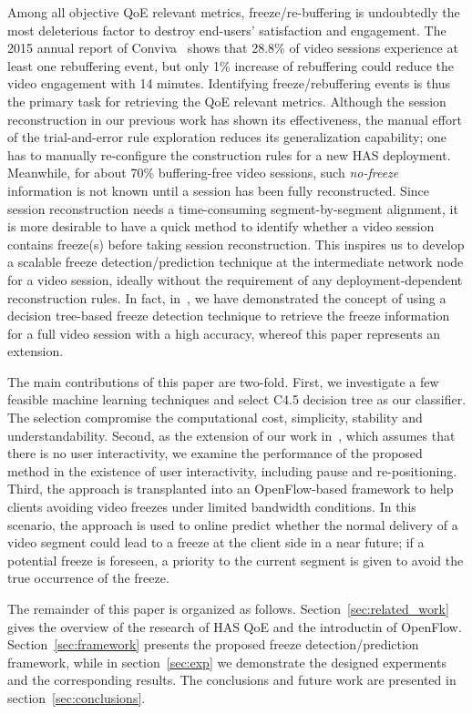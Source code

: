 \documentclass[journal]{IEEEtran}
\begin{document}
Among all objective QoE relevant metrics, freeze/re-buffering is undoubtedly the most deleterious factor to destroy end-users' satisfaction and engagement. The 2015 annual report of Conviva~\cite{convivaC:2015} shows that 28.8\% of video sessions experience at least one rebuffering event, but only 1\% increase of rebuffering could reduce the video engagement with 14 minutes. Identifying freeze/rebuffering events is thus the primary task for retrieving the QoE relevant metrics. Although the session reconstruction in our previous work has shown its effectiveness, the manual effort of the trial-and-error rule exploration reduces its generalization capability; one has to manually re-configure the construction rules for a new HAS deployment. Meanwhile, for about 70\% buffering-free video sessions, such {\it no-freeze} information is not known until a session has been fully reconstructed. Since session reconstruction needs a time-consuming segment-by-segment alignment, it is more desirable to have a quick method to identify whether a video session contains freeze(s) before taking session reconstruction. This inspires us to develop a scalable freeze detection/prediction technique at the intermediate network node for a video session, ideally without the requirement of any deployment-dependent reconstruction rules. In fact, in~\cite{wu:iwqos15}, we have demonstrated the concept of using a decision tree-based freeze detection technique to retrieve the freeze information for a full video session with a high accuracy, whereof this paper represents an extension.

The main contributions of this paper are two-fold. First, we investigate a few feasible machine learning techniques and select C4.5 decision tree as our classifier. The selection compromise the computational cost, simplicity, stability and understandability. Second, as the extension of our work in~\cite{wu:iwqos15}, which assumes that there is no user interactivity, we examine the performance of the proposed method in the existence of user interactivity, including pause and re-positioning. Third, the approach is transplanted into an OpenFlow-based framework to help clients avoiding video freezes under limited bandwidth conditions. In this scenario, the approach is used to online predict whether the normal delivery of a video segment could lead to a freeze at the client side in a near future; if a potential freeze is foreseen, a priority to the current segment is given to avoid the true occurrence of the freeze. 

The remainder of this paper is organized as follows. Section~\ref{sec:related_work} gives the overview of the research of HAS QoE and the introductin of OpenFlow. Section~\ref{sec:framework} presents the proposed freeze detection/prediction framework, while in section~\ref{sec:exp} we demonstrate the designed experments and the corresponding results. The conclusions and future work are presented in section~\ref{sec:conclusions}.
\end{document}

